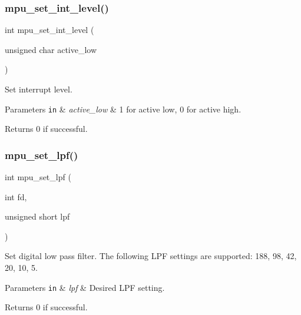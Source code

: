 \subsubsection{mpu\+\_\+set\+\_\+int\+\_\+level()}
{\footnotesize\ttfamily int mpu\+\_\+set\+\_\+int\+\_\+level (\begin{DoxyParamCaption}\item[{unsigned char}]{active\+\_\+low }\end{DoxyParamCaption})}



Set interrupt level. 


\begin{DoxyParams}[1]{Parameters}
\mbox{\tt in}  & {\em active\+\_\+low} & 1 for active low, 0 for active high. \\
\hline
\end{DoxyParams}
\begin{DoxyReturn}{Returns}
0 if successful. 
\end{DoxyReturn}
\mbox{\label{group___d_r_i_v_e_r_s_ga446662c1f77eebe4285c6dd2b3a107f4}} 
\subsubsection{mpu\+\_\+set\+\_\+lpf()}
{\footnotesize\ttfamily int mpu\+\_\+set\+\_\+lpf (\begin{DoxyParamCaption}\item[{int}]{fd,  }\item[{unsigned short}]{lpf }\end{DoxyParamCaption})}



Set digital low pass filter. The following L\+PF settings are supported\+: 188, 98, 42, 20, 10, 5. 


\begin{DoxyParams}[1]{Parameters}
\mbox{\tt in}  & {\em lpf} & Desired L\+PF setting. \\
\hline
\end{DoxyParams}
\begin{DoxyReturn}{Returns}
0 if successful. 
\end{DoxyReturn}
\mbox{\label{group___d_r_i_v_e_r_s_ga83f4b5cf2eaaaf633383d239712a4b24}} 
